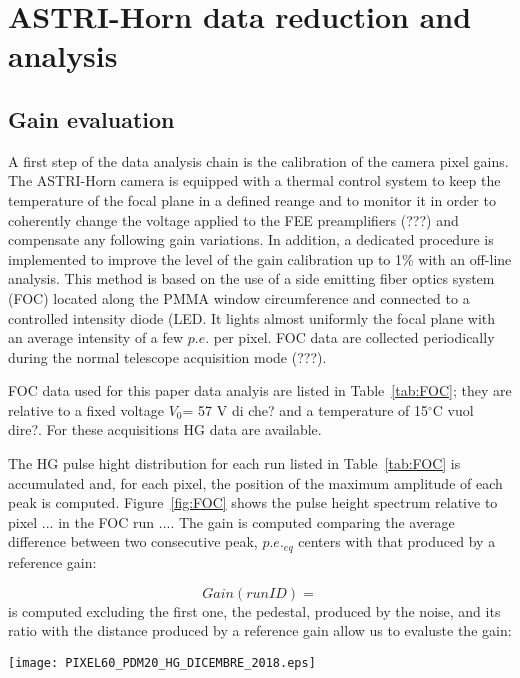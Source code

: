 \section{ASTRI-Horn data reduction and analysis} 
\label{sect:astridata}

\subsection{Gain evaluation}
\label{subs:gain}

A first step of the data analysis chain is the calibration of the camera pixel gains. 
The ASTRI-Horn camera is equipped with a thermal control system to keep the temperature of the focal plane in a defined reange and to monitor it in order to coherently change the voltage applied to the FEE preamplifiers (???) and compensate any following  gain variations. In addition, a dedicated procedure is implemented to improve the level of the gain calibration up to 1\% with an off-line analysis. This method is based on the use of a side emitting fiber optics system (FOC) located along the PMMA window circumference and connected to a controlled intensity diode (LED. It lights almost uniformly the focal plane with an average intensity of a few $p.e.$ per pixel. FOC data are collected periodically during the normal telescope acquisition mode (???).

FOC data used for this paper data analyis are listed in Table~\ref{tab:FOC}; they are relative to a fixed voltage $V_{0}$= 57 V {\tem di che?} and a temperature of 15$^\circ$C {\che vuol dire?}. For these acquisitions HG data are available.

The HG pulse hight distribution for each run listed in Table~\ref{tab:FOC} is accumulated and, for each pixel, the position of the maximum amplitude of each peak is computed. Figure~\ref{fig:FOC} shows the pulse height spectrum relative to pixel ... in the FOC run .... The gain is computed comparing the average difference between two consecutive peak, $p.e._{eq}$ centers with that produced by a reference gain:

\begin{equation}
Gain(run ID)=
\end{equation}
is computed excluding the first one, the pedestal, produced by the noise, and its ratio with the distance produced by a reference gain allow us to evaluste the gain:



 


\begin{figure*}[ht!!]
\centering
\texttt{[image: PIXEL60\_PDM20\_HG\_DICEMBRE\_2018.eps]}
\vspace{0.5cm}
\caption{ Pulse height spectrum at a fixed temperature of 15$^\circ$C
and $V_{0}$=57 V for a camera pixel, during a FOC run in the HG electronics chain. 
The black curve represents the distribution of the peak detector output and the red curve shows the corresponding
multiple peaks Gaussian fit.}
\label{fig:FOC}
\end{figure*}

